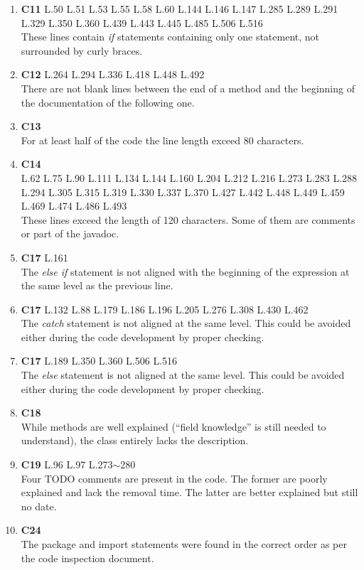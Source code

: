 \begin{enumerate}
	\item \textbf{C11} L.50 L.51 L.53 L.55 L.58 L.60 L.144 L.146 L.147 L.285 L.289 L.291 L.329 L.350 L.360 L.439 L.443 L.445 L.485 L.506 L.516 \\ These lines contain \textit{if} statements containing only one statement, not surrounded by curly braces.
	\item \textbf{C12} L.264 L.294 L.336 L.418 L.448 L.492 \\ There are not blank lines between the end of a method and the beginning of the documentation of the following one.
	\item \textbf{C13} \\ For at least half of the code the line length exceed 80 characters.
	\item \textbf{C14} \\ L.62 L.75 L.90 L.111 L.134 L.144 L.160 L.204 L.212 L.216 L.273 L.283 L.288 L.294 L.305 L.315 L.319 L.330 L.337 L.370 L.427 L.442 L.448 L.449 L.459 L.469 L.474 L.486 L.493 \\ These lines exceed the length of 120 characters. Some of them are comments or part of the javadoc.
	\item \textbf{C17} L.161 \\ The \textit{else if} statement is not aligned with the beginning of the expression at the same level as the previous line.
	\item \textbf{C17} L.132 L.88 L.179 L.186 L.196 L.205 L.276 L.308 L.430 L.462 \\ The \textit{catch} statement is not aligned at the same level. This could be avoided either during the code development by proper checking.
	\item \textbf{C17} L.189 L.350 L.360 L.506 L.516 \\ The \textit{else} statement is not aligned at the same level. This could be avoided either during the code development by proper checking.
	\item \textbf{C18} \\ While methods are well explained (``field knowledge'' is still needed to understand), the class entirely lacks the description.
	\item \textbf{C19} L.96 L.97 L.273$\sim$280 \\ Four TODO comments are present in the code. The former are poorly explained and lack the removal time. The latter are better explained but still no date.
	\item \textbf{C24} \\ The package and import statements were found in the correct order as per the code inspection document.

\end{enumerate}
